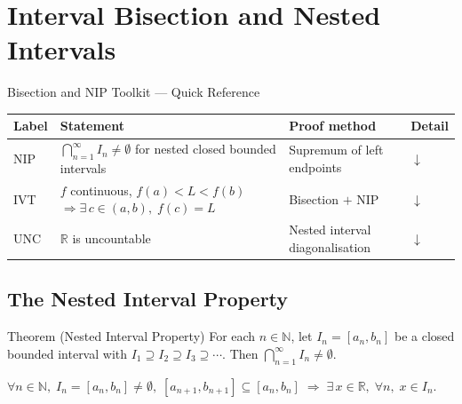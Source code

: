 
\section{Interval Bisection and Nested Intervals}
\label{sec:bisection-nested}

\begin{toolkitbox}{Bisection and NIP Toolkit --- Quick Reference}
\small
\begin{tabular}{l l l l}
\toprule
\textbf{Label} & \textbf{Statement} & \textbf{Proof method} & \textbf{Detail} \\
\midrule
NIP
  & $\bigcap_{n=1}^{\infty}I_n\neq\emptyset$ for nested closed bounded intervals
  & Supremum of left endpoints
  & \hyperref[thm:nested-interval-property]{$\downarrow$} \\[4pt]
IVT
  & $f$ continuous, $f(a)<L<f(b)$
    $\Rightarrow\exists\,c\in(a,b),\;f(c)=L$
  & Bisection $+$ NIP
  & \hyperref[prop:ivt-bisection]{$\downarrow$} \\[4pt]
UNC
  & $\mathbb{R}$ is uncountable
  & Nested interval diagonalisation
  & \hyperref[prop:r-uncountable]{$\downarrow$} \\
\bottomrule
\end{tabular}
\end{toolkitbox}

\subsection*{The Nested Interval Property}
\label{subsec:nip}

\begin{theorembox}{Theorem (Nested Interval Property)}
\label{thm:nested-interval-property}
For each $n\in\mathbb{N}$, let $I_n=[a_n,b_n]$ be a closed bounded interval
with $I_1\supseteq I_2\supseteq I_3\supseteq\cdots$. Then
$\displaystyle\bigcap_{n=1}^{\infty}I_n\neq\emptyset$.
\end{theorembox}

\begin{remark}
$\forall n\in\mathbb{N},\;I_n=[a_n,b_n]\neq\emptyset,\;
[a_{n+1},b_{n+1}]\subseteq[a_n,b_n]
\;\Longrightarrow\;
\exists\,x\in\mathbb{R},\;\forall n,\;x\in I_n$.
\end{remark}

